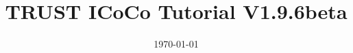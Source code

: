\documentclass[10pt, hyperref={unicode=true,pdfusetitle, bookmarks=true,bookmarksnumbered=false,bookmarksopen=false, breaklinks=false,pdfborder={0 0 1},backref=true,colorlinks=true,linkcolor=darkblue,pageanchor, urlcolor=darkblue}]{beamer}
\title[TRUST ICoCo Tutorial V1.9.6beta]{TRUST ICoCo Tutorial V1.9.6beta}
\institute[CEA/DES/ISAS/DM2S] %
{
CEA Saclay \\ %
\medskip
\textit{Support team: trust@cea.fr} %
\medskip
}
\date{\today} %
\begin{document}
\begin{frame}
\titlepage %
\end{frame}

\begin{frame}
\tableofcontents [hideallsubsections]
\end{frame}
\end{document}
